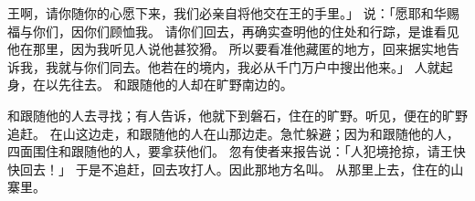 {王啊，请你随你的心愿下来，我们必亲自将他交在王的手里。」
说：「愿耶和华赐福与你们，因你们顾恤我。
请你们回去，再确实查明他的住处和行踪，是谁看见他在那里，因为我听见人说他甚狡猾。
所以要看准他藏匿的地方，回来据实地告诉我，我就与你们同去。他若在{}的境内，我必从千门万户中搜出他来。」
人就起身，在{}以先往{}去。
{}和跟随他的人却在{}旷野南边的{}。
\par }{\PP {}和跟随他的人去寻找{}；有人告诉{}，他就下到磐石，住在{}的旷野。{}听见，便在{}的旷野追赶{}。
在山这边走，{}和跟随他的人在山那边走。{}急忙躲避{}；因为{}和跟随他的人，四面围住{}和跟随他的人，要拿获他们。
忽有使者来报告{}说：「{}人犯境抢掠，请王快快回去！」
于是{}不追赶{}，回去攻打{}人。因此那地方名叫{}。
从那里上去，住在{}的山寨里。

}
